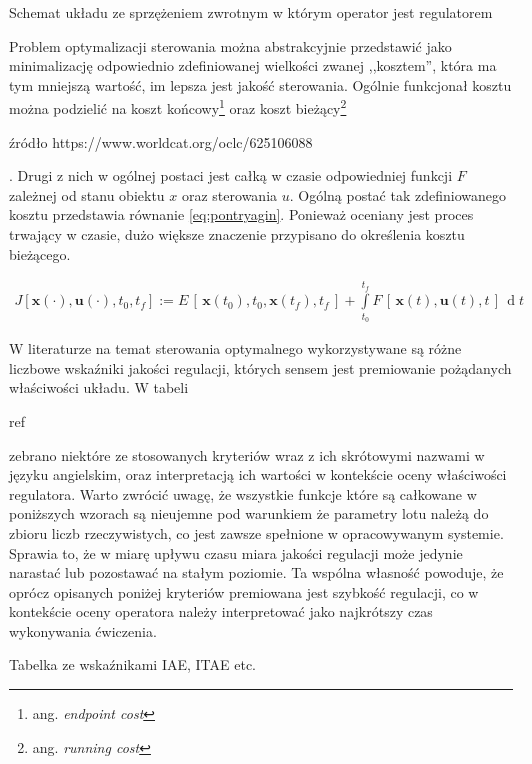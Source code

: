\begin{todo}
    Schemat układu ze sprzężeniem  zwrotnym w którym operator jest regulatorem
\end{todo}

Problem optymalizacji sterowania można abstrakcyjnie przedstawić jako minimalizację odpowiednio zdefiniowanej wielkości zwanej ,,kosztem'', która ma tym mniejszą wartość, im lepsza jest jakość sterowania. Ogólnie funkcjonał kosztu można podzielić na koszt końcowy\footnote{ang. \emph{endpoint cost}} oraz koszt bieżący\footnote{ang. \emph{running cost}} \begin{todo}źródło https://www.worldcat.org/oclc/625106088 \end{todo}. Drugi z nich w ogólnej postaci jest całką w czasie odpowiedniej funkcji $ F $ zależnej od stanu obiektu $ x $ oraz sterowania $ u $. Ogólną postać tak zdefiniowanego kosztu przedstawia równanie \ref{eq:pontryagin}. Ponieważ oceniany jest proces trwający w czasie, dużo większe znaczenie przypisano do określenia kosztu bieżącego.

\begin{align}
    \label{eq:pontryagin}
    J[\textbf{x}(\cdot), \textbf{u}(\cdot), t_0, t_f] :=E\,[\,\textbf{x}(t_0),t_0,\textbf{x}(t_f),t_f\,] + \int\limits_{t_0}^{t_f} F\,[\,\textbf{x}(t),\textbf{u}(t),t\,] \,\operatorname{d}t
\end{align}

W literaturze na temat sterowania optymalnego wykorzystywane są różne liczbowe wskaźniki jakości regulacji, których sensem jest premiowanie pożądanych właściwości układu. W tabeli \begin{todo}ref\end{todo} zebrano niektóre ze stosowanych kryteriów wraz z ich skrótowymi nazwami w języku angielskim, oraz interpretacją ich wartości w kontekście oceny właściwości regulatora. Warto zwrócić uwagę, że wszystkie funkcje które są całkowane w poniższych wzorach są nieujemne pod warunkiem że parametry lotu należą do zbioru liczb rzeczywistych, co jest zawsze spełnione w opracowywanym systemie. Sprawia to, że w miarę upływu czasu miara jakości regulacji może jedynie narastać lub pozostawać na stałym poziomie. Ta wspólna własność powoduje, że oprócz opisanych poniżej kryteriów premiowana jest szybkość regulacji, co w kontekście oceny operatora należy interpretować jako najkrótszy czas wykonywania ćwiczenia.

\begin{todo}
    Tabelka ze wskaźnikami IAE, ITAE etc.
\end{todo}

